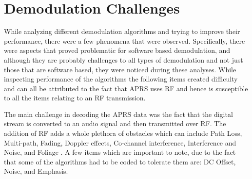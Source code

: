 \chapter{Demodulation Challenges}
While analyzing different demodulation algorithms and trying to improve their performance, there were a few phenomena that were observed. Specifically, there were aspects that proved problematic for software based demodulation, and although they are probably challenges to all types of demodulation and not just those that are software based, they were noticed during these analyses. While inspecting performance of the algorithms the following items created difficulty and can all be attributed to the fact that APRS uses RF and hence is susceptible to all the items relating to an RF transmission. 

The main challenge in decoding the APRS data was the fact that the digital stream is converted to an audio signal and then transmitted over RF. The addition of RF adds a whole plethora of obstacles which can include Path Loss, Multi-path, Fading, Doppler effects, Co-channel interference, Interference and Noise, and Foliage \cite{Goleniewski2006}. A few items which are important to note, due to the fact that some of the algorithms had to be coded to tolerate them are: DC Offset, Noise, and Emphasis.

